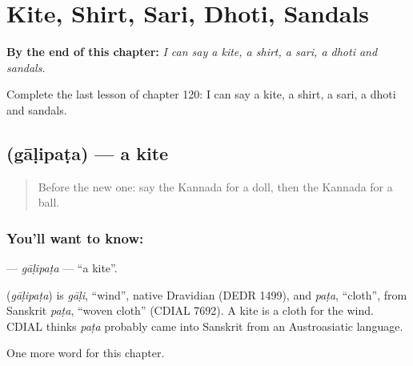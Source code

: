 
\chapter{Kite, Shirt, Sari, Dhoti, Sandals}
\label{ch:ka-kite-shirt-sari-dhoti-sandals}

\begin{chapteropening}
\textbf{By the end of this chapter:} \emph{I can say a kite, a shirt, a sari, a dhoti and sandals.}

Complete the last lesson of chapter 120: I can say a kite, a shirt, a sari, a dhoti and sandals.
\end{chapteropening}

\section[\texorpdfstring{\kn{ಗಾಳಿಪಟ} (gāḷipaṭa)}{ಗಾಳಿಪಟ (gāḷipaṭa)}]{ (gāḷipaṭa) — a kite}

\label{lesson:KA-C120-galipata}



\begin{quote}
Before the new one: say the Kannada for a doll, then the Kannada for a ball.
\end{quote}

\subsection*{You'll want to know: }
\textbf{} — \emph{gāḷipaṭa} — \textquotedblleft{}a kite\textquotedblright{}.

\begin{cousinweb}
\textbf{} (\emph{gāḷipaṭa}) is \emph{gāḷi}, \textquotedblleft{}wind\textquotedblright{}, native Dravidian (DEDR 1499), and \emph{paṭa}, \textquotedblleft{}cloth\textquotedblright{}, from Sanskrit \emph{paṭa}, \textquotedblleft{}woven cloth\textquotedblright{} (CDIAL 7692). A kite is a cloth for the wind. CDIAL thinks \emph{paṭa} probably came into Sanskrit from an Austroasiatic language.
\end{cousinweb}

\begin{grammarlens}[title={What you've built}]
One more word for this chapter.
\end{grammarlens}

